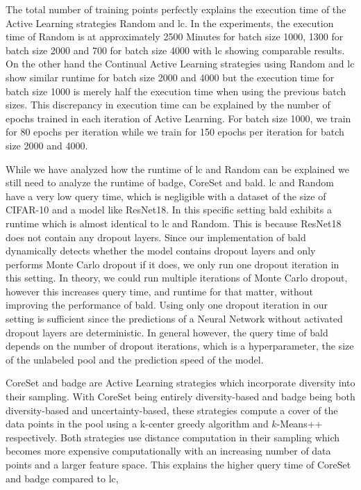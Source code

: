 The total number of training points perfectly explains the execution time of the Active Learning strategies Random and \gls{lc}. In the experiments,
the execution time of Random is at approximately 2500 Minutes for batch size 1000, 1300 for batch size 2000 and 700 for batch size 4000 with \gls{lc}
showing comparable results. On the other hand the Continual Active Learning strategies using Random and \gls{lc} show similar runtime for batch size
2000 and 4000 but the execution time for batch size 1000 is merely half the execution time when using the previous batch sizes. This discrepancy in
execution time can be explained by the number of epochs trained in each iteration of Active Learning. For batch size 1000, we train for 80 epochs per
iteration while we train for 150 epochs per iteration for batch size 2000 and 4000. \par
While we have analyzed how the runtime of \gls{lc} and Random can be explained we still need to analyze the runtime of \gls{badge}, CoreSet and \gls{bald}.
\gls{lc} and Random have a very low query time, which is negligible with a dataset of the size of CIFAR-10 and a model like ResNet18. In this specific
setting \gls{bald} exhibits a runtime which is almost identical to \gls{lc} and Random. This is because ResNet18 does not contain any dropout layers.
Since our implementation of \gls{bald} dynamically detects whether the model contains dropout layers and only performs Monte Carlo dropout if it does,
we only run one dropout iteration in this setting. In theory, we could run multiple iterations of Monte Carlo dropout, however this increases query time,
and runtime for that matter, without improving the performance of \gls{bald}. Using only one dropout iteration in our setting is sufficient since the
predictions of a Neural Network without activated dropout layers are deterministic. In general however, the query time of \gls{bald} depends on the number
of dropout iterations, which is a hyperparameter, the size of the unlabeled pool and the prediction speed of the model. \par
CoreSet and \gls{badge} are Active Learning strategies which incorporate diversity into their sampling. With CoreSet being entirely diversity-based and
\gls{badge} being both diversity-based and uncertainty-based, these strategies compute a cover of the data points in the pool using a k-center greedy
algorithm and $k$-Means++ respectively. Both strategies use distance computation in their sampling which becomes more expensive computationally with an
increasing number of data points and a larger feature space. This explains the higher query time of CoreSet and \gls{badge} compared to \gls{lc},
